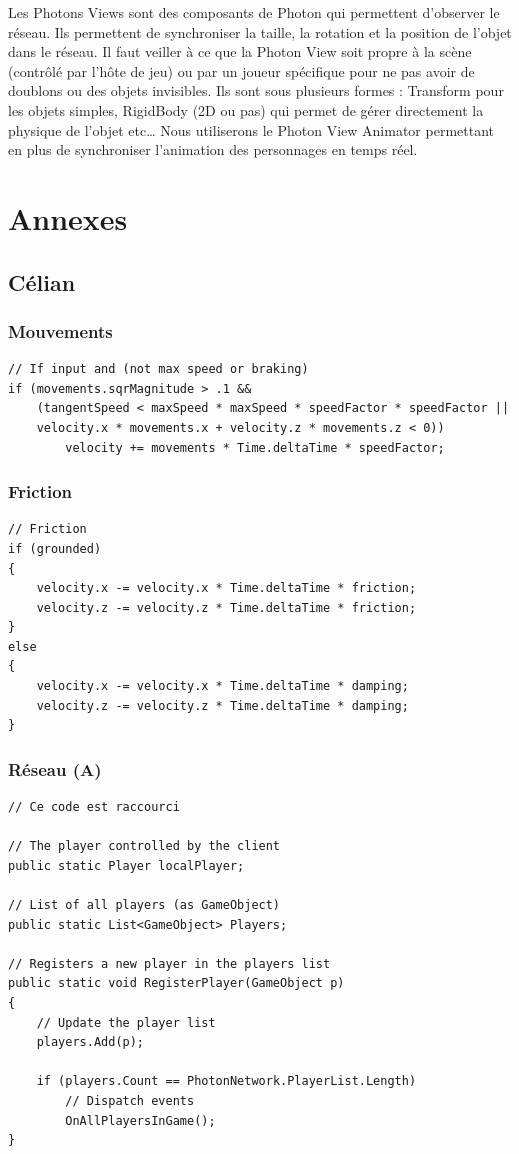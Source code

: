 \documentclass{article}
\begin{document}
Les Photons Views sont des composants de Photon qui permettent d’observer le réseau. Ils permettent de synchroniser la taille, la rotation et la position de l’objet dans le réseau. Il faut veiller à ce que la Photon View soit propre à la scène (contrôlé par l’hôte de jeu) ou par un joueur spécifique pour ne pas avoir de doublons ou des objets invisibles.
Ils sont sous plusieurs formes : Transform pour les objets simples, RigidBody (2D ou pas) qui permet de gérer directement la physique de l’objet etc… Nous utiliserons le Photon View Animator permettant en plus de synchroniser l’animation des personnages en temps réel.


\newpage
\section{Annexes}


\subsection{Célian}
\subsubsection{Mouvements}
\label{Mouvements}
\begin{lstlisting}
// If input and (not max speed or braking)
if (movements.sqrMagnitude > .1 &&
    (tangentSpeed < maxSpeed * maxSpeed * speedFactor * speedFactor ||
    velocity.x * movements.x + velocity.z * movements.z < 0))
        velocity += movements * Time.deltaTime * speedFactor;
\end{lstlisting}

\subsubsection{Friction}
\label{Friction}
\begin{lstlisting}
// Friction
if (grounded)
{
    velocity.x -= velocity.x * Time.deltaTime * friction;
    velocity.z -= velocity.z * Time.deltaTime * friction;
}
else
{
    velocity.x -= velocity.x * Time.deltaTime * damping;
    velocity.z -= velocity.z * Time.deltaTime * damping;
}
\end{lstlisting}


\subsubsection{Réseau (A)}
\label{NetA}
\begin{lstlisting}
// Ce code est raccourci

// The player controlled by the client
public static Player localPlayer;

// List of all players (as GameObject)
public static List<GameObject> Players;

// Registers a new player in the players list
public static void RegisterPlayer(GameObject p)
{
    // Update the player list
    players.Add(p);

    if (players.Count == PhotonNetwork.PlayerList.Length)
        // Dispatch events
        OnAllPlayersInGame();
}
\end{lstlisting}
\end{document}

